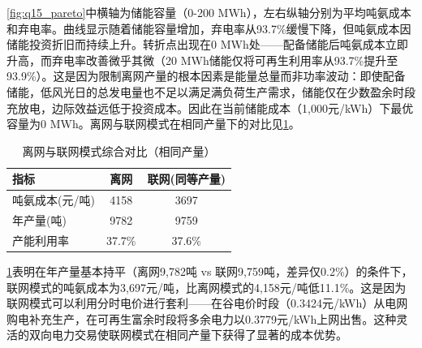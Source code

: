 \cref{fig:q15_pareto}中横轴为储能容量（0-200 MWh），左右纵轴分别为平均吨氨成本和弃电率。曲线显示随着储能容量增加，弃电率从93.7\%缓慢下降，但吨氨成本因储能投资折旧而持续上升。转折点出现在0 MWh处——配备储能后吨氨成本立即升高，而弃电率改善微乎其微（20 MWh储能仅将可再生利用率从93.7\%提升至93.9\%）。这是因为限制离网产量的根本因素是能量总量而非功率波动：即使配备储能，低风光日的总发电量也不足以满足满负荷生产需求，储能仅在少数盈余时段充放电，边际效益远低于投资成本。因此在当前储能成本（1,000元/kWh）下最优容量为0 MWh。离网与联网模式在相同产量下的对比见\cref{tab:q4_comparison}。

\begin{table}[H]
\centering
\caption{离网与联网模式综合对比（相同产量）}
\label{tab:q4_comparison}
\begin{tabular*}{\textwidth}{@{\extracolsep{\fill}}lcc}
\toprule[1.5pt]
指标 & 离网 & 联网(同等产量) \\
\midrule[1pt]
吨氨成本(元/吨) & 4158 & 3697 \\
年产量(吨) & 9782 & 9759 \\
产能利用率 & 37.7\% & 37.6\% \\
\bottomrule[1.5pt]
\end{tabular*}
\end{table}

\cref{tab:q4_comparison}表明在年产量基本持平（离网9,782吨 vs 联网9,759吨，差异仅0.2\%）的条件下，联网模式的吨氨成本为3,697元/吨，比离网模式的4,158元/吨低11.1\%。这是因为联网模式可以利用分时电价进行套利——在谷电价时段（0.3424元/kWh）从电网购电补充生产，在可再生富余时段将多余电力以0.3779元/kWh上网出售。这种灵活的双向电力交易使联网模式在相同产量下获得了显著的成本优势。
